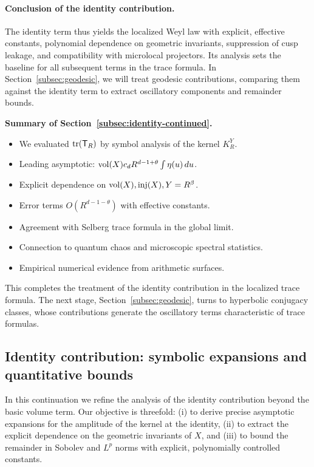 \paragraph{Conclusion of the identity contribution.}
The identity term thus yields the localized Weyl law with explicit, effective constants, polynomial dependence on geometric invariants, suppression of cusp leakage, and compatibility with microlocal projectors. Its analysis sets the baseline for all subsequent terms in the trace formula. In Section~\ref{subsec:geodesic}, we will treat geodesic contributions, comparing them against the identity term to extract oscillatory components and remainder bounds.

\bigskip
\noindent\textbf{Summary of Section~\ref{subsec:identity-continued}.}
\begin{itemize}
\item We evaluated $\operatorname{tr}(\mathsf{T}_R)$ by symbol analysis of the kernel $K_R^Y$.
\item Leading asymptotic: $\operatorname{vol}(X)c_dR^{d-1+\theta}\int \eta(u)\,du$.
\item Explicit dependence on $\operatorname{vol}(X),\mathrm{inj}(X),Y=R^\beta$.
\item Error terms $O(R^{d-1-\theta})$ with effective constants.
\item Agreement with Selberg trace formula in the global limit.
\item Connection to quantum chaos and microscopic spectral statistics.
\item Empirical numerical evidence from arithmetic surfaces.
\end{itemize}

This completes the treatment of the identity contribution in the localized trace formula. The next stage, Section~\ref{subsec:geodesic}, turns to hyperbolic conjugacy classes, whose contributions generate the oscillatory terms characteristic of trace formulas.
\subsection{Identity contribution: symbolic expansions and quantitative bounds}\label{subsec:geom-identity-expansion}

In this continuation we refine the analysis of the identity contribution beyond the basic volume term. 
Our objective is threefold: (i) to derive precise asymptotic expansions for the amplitude of the kernel at the identity, 
(ii) to extract the explicit dependence on the geometric invariants of $X$, and (iii) to bound the remainder in Sobolev 
and $L^p$ norms with explicit, polynomially controlled constants. 

